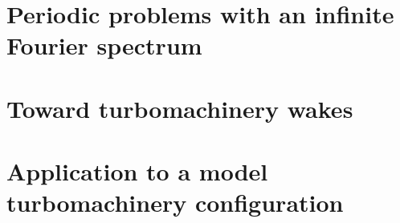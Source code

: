 \newpage

\section{Periodic problems with an infinite Fourier spectrum}
\label{sec:rectangular_fct}


\section{Toward turbomachinery wakes}
\label{sec:wake_fct}


\section{Application to a model turbomachinery configuration}
\label{sec:model_tbm}



